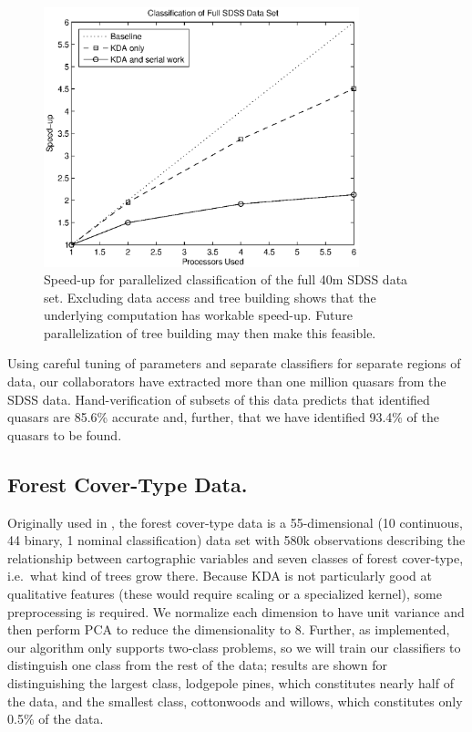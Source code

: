 \documentclass[twoside,leqno,twocolumn]{article}
\begin{document}
\begin{figure}[tb]
  \begin{center}
    \hspace*{-.3in}
    \includegraphics[width=3.6in]{para_speedup.eps}
    \hspace*{-.3in}
  \end{center}
  \vspace{-15pt}
  \caption{\label{fig:bad-para-speedup}\footnotesize Speed-up for
    parallelized classification of the full 40m SDSS data set.
    Excluding data access and tree building shows that the underlying
    computation has workable speed-up.  Future parallelization of tree
    building may then make this feasible.}
\end{figure}

Using careful tuning of parameters and separate classifiers for
separate regions of data, our collaborators have extracted more than
one million quasars from the SDSS data.  Hand-verification of subsets
of this data predicts that identified quasars are 85.6\% accurate and,
further, that we have identified 93.4\% of the quasars to be found.

\subsection{Forest Cover-Type Data.}
Originally used in \cite{blackard98}, the forest cover-type data is a
55-dimensional (10 continuous, 44 binary, 1 nominal classification)
data set with 580k observations describing the relationship between
cartographic variables and seven classes of forest cover-type,
i.e.~what kind of trees grow there.  Because KDA is not particularly
good at qualitative features (these would require scaling or a
specialized kernel), some preprocessing is required.  We normalize
each dimension to have unit variance and then perform PCA to reduce
the dimensionality to 8.  Further, as implemented, our algorithm only
supports two-class problems, so we will train our classifiers to
distinguish one class from the rest of the data; results are shown for
distinguishing the largest class, lodgepole pines, which constitutes
nearly half of the data, and the smallest class, cottonwoods and
willows, which constitutes only 0.5\% of the data.
\end{document}
